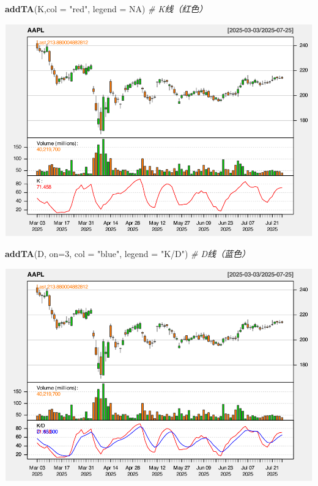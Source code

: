 \documentclass[]{ctexbook}
\newenvironment{Shaded}{\begin{snugshade}}{\end{snugshade}}
\newcommand{\AttributeTok}[1]{\textcolor[rgb]{0.13,0.29,0.53}{#1}}
\newcommand{\CommentTok}[1]{\textcolor[rgb]{0.56,0.35,0.01}{\textit{#1}}}
\newcommand{\ConstantTok}[1]{\textcolor[rgb]{0.56,0.35,0.01}{#1}}
\newcommand{\DecValTok}[1]{\textcolor[rgb]{0.00,0.00,0.81}{#1}}
\newcommand{\FunctionTok}[1]{\textcolor[rgb]{0.13,0.29,0.53}{\textbf{#1}}}
\newcommand{\NormalTok}[1]{#1}
\newcommand{\StringTok}[1]{\textcolor[rgb]{0.31,0.60,0.02}{#1}}
\begin{document}
\begin{Shaded}
\begin{Highlighting}[]
\FunctionTok{addTA}\NormalTok{(K,}\AttributeTok{col =} \StringTok{"red"}\NormalTok{, }\AttributeTok{legend =} \ConstantTok{NA}\NormalTok{)    }\CommentTok{\# K线（红色）}
\end{Highlighting}
\end{Shaded}

\includegraphics[width=0.9\linewidth]{QuantmodHandbook_files/figure-latex/wpr_2-2}

\begin{Shaded}
\begin{Highlighting}[]
\FunctionTok{addTA}\NormalTok{(D, }\AttributeTok{on=}\DecValTok{3}\NormalTok{, }\AttributeTok{col =} \StringTok{"blue"}\NormalTok{, }\AttributeTok{legend =} \StringTok{"K/D"}\NormalTok{)   }\CommentTok{\# D线（蓝色）}
\end{Highlighting}
\end{Shaded}

\includegraphics[width=0.9\linewidth]{QuantmodHandbook_files/figure-latex/wpr_2-3}
\end{document}
